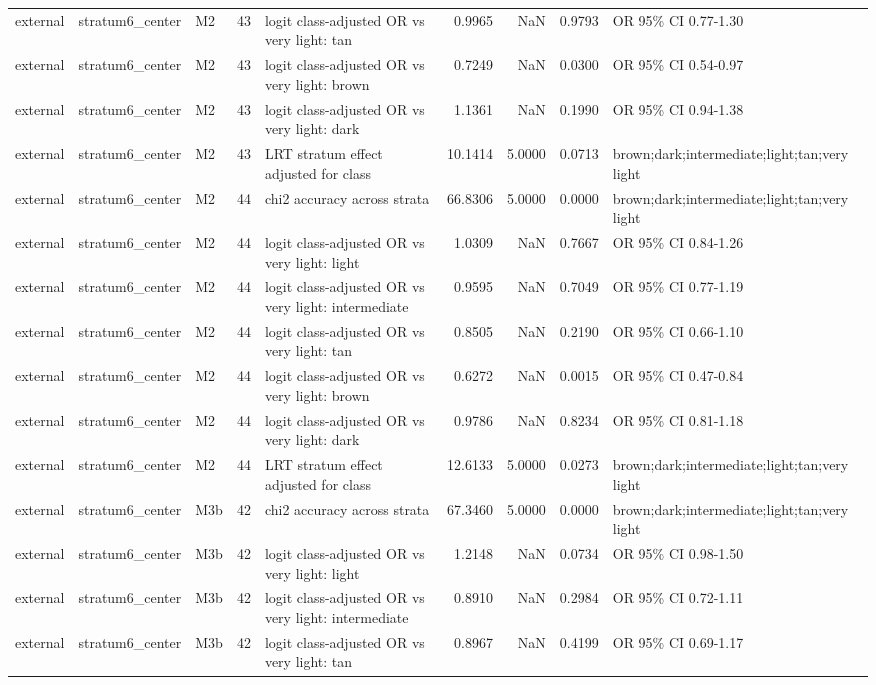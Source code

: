 \begin{tabular}{lllrlrrrl}
external & stratum6\_center & M2 & 43 & logit class-adjusted OR vs very light: tan & 0.9965 & NaN & 0.9793 & OR 95\% CI 0.77-1.30 \\
external & stratum6\_center & M2 & 43 & logit class-adjusted OR vs very light: brown & 0.7249 & NaN & 0.0300 & OR 95\% CI 0.54-0.97 \\
external & stratum6\_center & M2 & 43 & logit class-adjusted OR vs very light: dark & 1.1361 & NaN & 0.1990 & OR 95\% CI 0.94-1.38 \\
external & stratum6\_center & M2 & 43 & LRT stratum effect adjusted for class & 10.1414 & 5.0000 & 0.0713 & brown;dark;intermediate;light;tan;very light \\
external & stratum6\_center & M2 & 44 & chi2 accuracy across strata & 66.8306 & 5.0000 & 0.0000 & brown;dark;intermediate;light;tan;very light \\
external & stratum6\_center & M2 & 44 & logit class-adjusted OR vs very light: light & 1.0309 & NaN & 0.7667 & OR 95\% CI 0.84-1.26 \\
external & stratum6\_center & M2 & 44 & logit class-adjusted OR vs very light: intermediate & 0.9595 & NaN & 0.7049 & OR 95\% CI 0.77-1.19 \\
external & stratum6\_center & M2 & 44 & logit class-adjusted OR vs very light: tan & 0.8505 & NaN & 0.2190 & OR 95\% CI 0.66-1.10 \\
external & stratum6\_center & M2 & 44 & logit class-adjusted OR vs very light: brown & 0.6272 & NaN & 0.0015 & OR 95\% CI 0.47-0.84 \\
external & stratum6\_center & M2 & 44 & logit class-adjusted OR vs very light: dark & 0.9786 & NaN & 0.8234 & OR 95\% CI 0.81-1.18 \\
external & stratum6\_center & M2 & 44 & LRT stratum effect adjusted for class & 12.6133 & 5.0000 & 0.0273 & brown;dark;intermediate;light;tan;very light \\
external & stratum6\_center & M3b & 42 & chi2 accuracy across strata & 67.3460 & 5.0000 & 0.0000 & brown;dark;intermediate;light;tan;very light \\
external & stratum6\_center & M3b & 42 & logit class-adjusted OR vs very light: light & 1.2148 & NaN & 0.0734 & OR 95\% CI 0.98-1.50 \\
external & stratum6\_center & M3b & 42 & logit class-adjusted OR vs very light: intermediate & 0.8910 & NaN & 0.2984 & OR 95\% CI 0.72-1.11 \\
external & stratum6\_center & M3b & 42 & logit class-adjusted OR vs very light: tan & 0.8967 & NaN & 0.4199 & OR 95\% CI 0.69-1.17 \\

\end{tabular}
